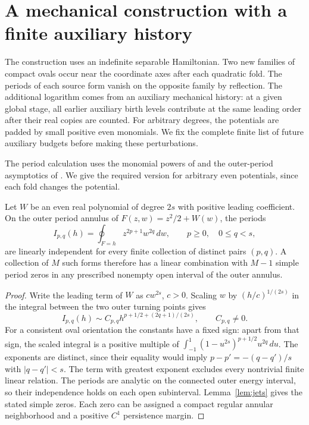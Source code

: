 \section{A mechanical construction with a finite auxiliary history}
\label{sec:mechanical}

The construction uses an indefinite separable Hamiltonian.  Two new
families of compact ovals occur near the coordinate axes after each
quadratic fold.  The periods of each source form vanish on the opposite family by
reflection.  The additional logarithm comes from an auxiliary mechanical
history: at a given global stage, all earlier auxiliary birth levels
contribute at the same leading order after their real copies are counted.
For arbitrary degrees, the potentials are padded by small positive even
monomials.  We fix the complete finite list of future auxiliary budgets
before making these perturbations.

The period calculation uses the monomial powers of
\cite[p.~445]{LiLiLlibreZhang2001} and the outer-period asymptotics of
\cite[Lemma~2.3]{HanRomanovski2011}. We give the required version for
arbitrary even potentials, since each fold changes the potential.

\begin{lemma}\label{lem:mechanical-rank}
Let $W$ be an even real polynomial of degree $2s$ with positive leading
coefficient.  On the outer period annulus of
$F(z,w)=z^2/2+W(w)$, the periods
\[
 I_{p,q}(h)=\oint_{F=h}z^{2p+1}w^{2q}\,dw,
 \qquad p\geq0,\quad 0\leq q<s,
\]
are linearly independent for every finite collection of distinct pairs
$(p,q)$.  A collection of $M$ such forms therefore has a linear
combination with $M-1$ simple period zeros in any prescribed nonempty
open interval of the outer annulus.
\end{lemma}

\begin{proof}
Write the leading term of $W$ as $c w^{2s}$, $c>0$.  Scaling $w$ by
$(h/c)^{1/(2s)}$ in the integral between the two outer turning points gives
\[
 I_{p,q}(h)\sim C_{p,q}
 h^{p+1/2+(2q+1)/(2s)},\qquad C_{p,q}\ne0.
\]
For a consistent oval orientation the constants have a fixed sign:
apart from that sign, the scaled integral is a positive multiple of
$\int_{-1}^{1}(1-u^{2s})^{p+1/2}u^{2q}\,du$.
The exponents are distinct, since their equality would imply
$p-p'=-(q-q')/s$ with $|q-q'|<s$.  The term with greatest exponent
excludes every nontrivial finite linear relation.  The periods are
analytic on the connected outer energy interval, so their independence
holds on each open subinterval.  Lemma~\ref{lem:jets} gives the stated
simple zeros.  Each zero can be assigned a compact regular annular
neighborhood and a positive $C^1$ persistence margin.
\end{proof}

